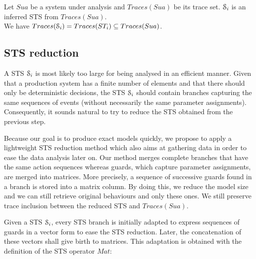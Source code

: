 \begin{proposition}
	\label{def:equivtraces_IOSTS}
    Let $Sua$ be a system under analysis and $Traces(Sua)$ be its trace set. $\EuScript{S}_i$ is an inferred STS from $Traces(Sua)$.
    \\We have $Traces(\EuScript{S}_i) = Traces(ST_i) \subseteq Traces(Sua)$.
\end{proposition}


\subsection{STS reduction}
\label{part3:reduction}

A STS $\EuScript{S}_i$ is most likely too large for being
analysed in an efficient manner. Given that a production system
has a finite number of elements and that there should only be
deterministic decisions, the STS $\EuScript{S}_i$ should
contain branches capturing the same sequences of events (without
necessarily the same parameter assignments). Consequently, it
sounds natural to try to reduce the STS obtained from the
previous step.

Because our goal is to produce exact models quickly, we propose to
apply a lightweight STS reduction method which also aims at
gathering data in order to ease the data analysis later on.
Our method merges complete branches that have the same action
sequences whereas guards, which capture parameter assignments,
are merged into matrices. More precisely, a sequence of
successive guards found in a branch is stored into a matrix
column. By doing this, we reduce the model size and we can still
retrieve original behaviours and only these ones. We still
preserve trace inclusion between the reduced STS and
$Traces(Sua)$.

Given a STS $\EuScript{S}_i$, every STS branch is initially
adapted to express sequences of guards in a vector form to ease
the STS reduction. Later, the concatenation of these vectors
shall give birth to matrices. This adaptation is obtained with
the definition of the STS operator $Mat$:


